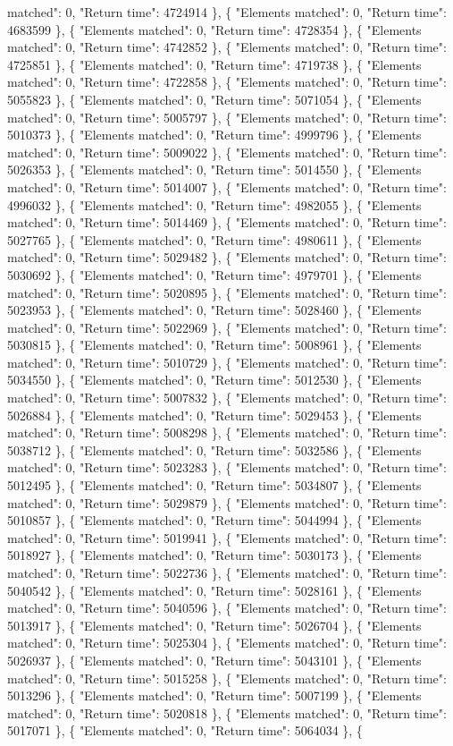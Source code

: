 matched": 0, "Return time": 4724914 \}, \{ "Elements matched": 0, "Return time": 4683599 \}, \{ "Elements matched": 0, "Return time": 4728354 \}, \{ "Elements matched": 0, "Return time": 4742852 \}, \{ "Elements matched": 0, "Return time": 4725851 \}, \{ "Elements matched": 0, "Return time": 4719738 \}, \{ "Elements matched": 0, "Return time": 4722858 \}, \{ "Elements matched": 0, "Return time": 5055823 \}, \{ "Elements matched": 0, "Return time": 5071054 \}, \{ "Elements matched": 0, "Return time": 5005797 \}, \{ "Elements matched": 0, "Return time": 5010373 \}, \{ "Elements matched": 0, "Return time": 4999796 \}, \{ "Elements matched": 0, "Return time": 5009022 \}, \{ "Elements matched": 0, "Return time": 5026353 \}, \{ "Elements matched": 0, "Return time": 5014550 \}, \{ "Elements matched": 0, "Return time": 5014007 \}, \{ "Elements matched": 0, "Return time": 4996032 \}, \{ "Elements matched": 0, "Return time": 4982055 \}, \{ "Elements matched": 0, "Return time": 5014469 \}, \{ "Elements matched": 0, "Return time": 5027765 \}, \{ "Elements matched": 0, "Return time": 4980611 \}, \{ "Elements matched": 0, "Return time": 5029482 \}, \{ "Elements matched": 0, "Return time": 5030692 \}, \{ "Elements matched": 0, "Return time": 4979701 \}, \{ "Elements matched": 0, "Return time": 5020895 \}, \{ "Elements matched": 0, "Return time": 5023953 \}, \{ "Elements matched": 0, "Return time": 5028460 \}, \{ "Elements matched": 0, "Return time": 5022969 \}, \{ "Elements matched": 0, "Return time": 5030815 \}, \{ "Elements matched": 0, "Return time": 5008961 \}, \{ "Elements matched": 0, "Return time": 5010729 \}, \{ "Elements matched": 0, "Return time": 5034550 \}, \{ "Elements matched": 0, "Return time": 5012530 \}, \{ "Elements matched": 0, "Return time": 5007832 \}, \{ "Elements matched": 0, "Return time": 5026884 \}, \{ "Elements matched": 0, "Return time": 5029453 \}, \{ "Elements matched": 0, "Return time": 5008298 \}, \{ "Elements matched": 0, "Return time": 5038712 \}, \{ "Elements matched": 0, "Return time": 5032586 \}, \{ "Elements matched": 0, "Return time": 5023283 \}, \{ "Elements matched": 0, "Return time": 5012495 \}, \{ "Elements matched": 0, "Return time": 5034807 \}, \{ "Elements matched": 0, "Return time": 5029879 \}, \{ "Elements matched": 0, "Return time": 5010857 \}, \{ "Elements matched": 0, "Return time": 5044994 \}, \{ "Elements matched": 0, "Return time": 5019941 \}, \{ "Elements matched": 0, "Return time": 5018927 \}, \{ "Elements matched": 0, "Return time": 5030173 \}, \{ "Elements matched": 0, "Return time": 5022736 \}, \{ "Elements matched": 0, "Return time": 5040542 \}, \{ "Elements matched": 0, "Return time": 5028161 \}, \{ "Elements matched": 0, "Return time": 5040596 \}, \{ "Elements matched": 0, "Return time": 5013917 \}, \{ "Elements matched": 0, "Return time": 5026704 \}, \{ "Elements matched": 0, "Return time": 5025304 \}, \{ "Elements matched": 0, "Return time": 5026937 \}, \{ "Elements matched": 0, "Return time": 5043101 \}, \{ "Elements matched": 0, "Return time": 5015258 \}, \{ "Elements matched": 0, "Return time": 5013296 \}, \{ "Elements matched": 0, "Return time": 5007199 \}, \{ "Elements matched": 0, "Return time": 5020818 \}, \{ "Elements matched": 0, "Return time": 5017071 \}, \{ "Elements matched": 0, "Return time": 5064034 \}, \{ 